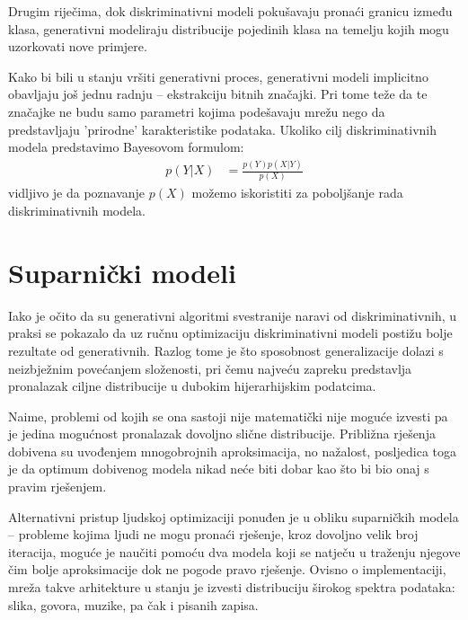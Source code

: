 \documentclass[lmodern, utf8, seminar]{fer}
\begin{document}
Drugim riječima, dok diskriminativni modeli pokušavaju pronaći granicu između klasa, generativni modeliraju distribucije pojedinih klasa na temelju kojih mogu uzorkovati nove primjere.
\newline


\newpage
Kako bi bili u stanju vršiti generativni proces, generativni modeli implicitno obavljaju još jednu radnju -- ekstrakciju bitnih značajki. Pri tome teže da te značajke ne budu samo parametri kojima podešavaju mrežu nego da predstavljaju 'prirodne' karakteristike podataka. 
\newline
Ukoliko cilj diskriminativnih modela predstavimo Bayesovom formulom:
\begin{equation}
\begin{split}
p(Y|X) &= \frac{p(Y)p(X|Y)}{p(X)}
\end{split}
\end{equation}
vidljivo je da poznavanje $p(X)$ možemo iskoristiti za poboljšanje rada diskriminativnih modela.

\newpage
\section{Suparnički modeli}
Iako je očito da su generativni algoritmi svestranije naravi od diskriminativnih, u praksi se pokazalo da uz ručnu optimizaciju diskriminativni modeli postižu bolje rezultate od generativnih. Razlog tome je što sposobnost generalizacije dolazi s neizbježnim povećanjem složenosti, pri čemu najveću zapreku predstavlja pronalazak ciljne distribucije u dubokim hijerarhijskim podatcima.

Naime, problemi od kojih se ona sastoji nije matematički nije moguće izvesti \cite{goodfellow2014generative} pa je jedina mogućnost pronalazak dovoljno slične distribucije. Približna rješenja dobivena su uvođenjem mnogobrojnih aproksimacija, no nažalost, posljedica toga je da optimum dobivenog modela nikad neće biti dobar kao što bi bio onaj s pravim rješenjem.
\newline

Alternativni pristup ljudskoj optimizaciji ponuđen je u obliku suparničkih modela -- probleme kojima ljudi ne mogu pronaći rješenje, kroz dovoljno velik broj iteracija, moguće je naučiti pomoću dva modela koji se natječu u traženju njegove čim bolje aproksimacije dok ne pogode pravo rješenje. Ovisno o implementaciji, mreža takve arhitekture u stanju je izvesti distribuciju širokog spektra podataka: slika, govora, muzike, pa čak i pisanih zapisa.
\newline
\end{document}
